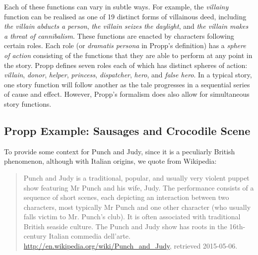 \documentclass{llncs}
\begin{document}
Each of these functions can vary in subtle ways. For example, the \emph{villainy} function can be realised as one of 19 distinct forms of villainous deed, including \emph{the villain abducts a person}, \emph{the villain seizes the daylight}, and \emph{the villain makes a threat of cannibalism}.
These functions are enacted by characters following certain roles. Each role (or \emph{dramatis persona} in Propp's definition) has a \emph{sphere of action} consisting of the functions that they are able to perform at any point in the story. Propp defines seven roles each of which has distinct spheres of action: \emph{villain}, \emph{donor}, \emph{helper}, \emph{princess}, \emph{dispatcher}, \emph{hero}, and \emph{false hero}.
In a typical story, one story function will follow another as the tale progresses in a sequential series of cause and effect. However, Propp's formalism does also allow for simultaneous story functions.

\subsection{Propp Example: Sausages and Crocodile Scene}\label{sec:pjexample}
To provide some context for Punch and Judy, since it is a peculiarly British phenomenon, although with Italian origins, we quote from Wikipedia:
\begin{quote}\small
Punch and Judy is a traditional, popular, and usually very violent puppet show featuring Mr Punch and his wife, Judy. The performance consists of a sequence of short scenes, each depicting an interaction between two characters, most typically Mr Punch and one other character (who usually falls victim to Mr. Punch's club). It is often associated with traditional British seaside culture.
The Punch and Judy show has roots in the 16th-century Italian commedia dell'arte. \\
\hfill{\footnotesize
\url{http://en.wikipedia.org/wiki/Punch_and_Judy}, retrieved 2015-05-06.}
\end{quote}
\end{document}
